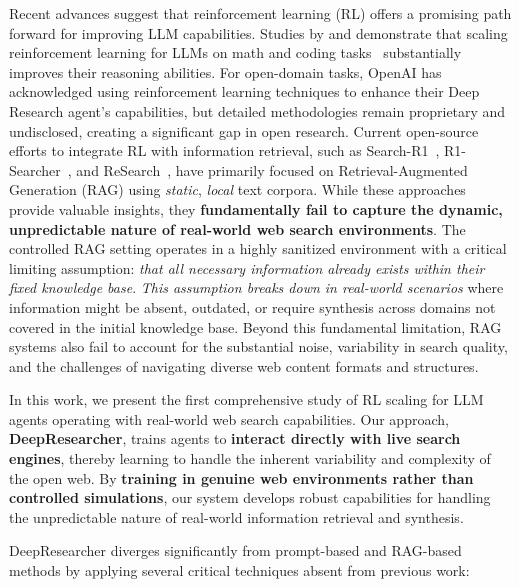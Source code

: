 \documentclass{article}
\newcommand{\scrl}{DeepResearcher\xspace}
\begin{document}
Recent advances suggest that reinforcement learning (RL) offers a promising path forward for improving LLM capabilities. Studies by \citet{guo2025deepseek} and \citet{team2025kimi} demonstrate that scaling reinforcement learning for LLMs on math and coding tasks~\cite{li2025limr} substantially improves their reasoning abilities. For open-domain tasks, OpenAI has acknowledged using reinforcement learning techniques to enhance their Deep Research agent's capabilities, but detailed methodologies remain proprietary and undisclosed, creating a significant gap in open research. Current open-source efforts to integrate RL with information retrieval, such as Search-R1~\cite{jin2025search}, R1-Searcher~\cite{song2025r1}, and ReSearch~\cite{chen2025research}, have primarily focused on Retrieval-Augmented Generation (RAG) using \emph{static}, \emph{local} text corpora. While these approaches provide valuable insights, they \textbf{fundamentally fail to capture the dynamic, unpredictable nature of real-world web search environments}. The controlled RAG setting operates in a highly sanitized environment with a critical limiting assumption: \emph{that all necessary information already exists within their fixed knowledge base}. \emph{This assumption breaks down in real-world scenarios} where information might be absent, outdated, or require synthesis across domains not covered in the initial knowledge base. Beyond this fundamental limitation, RAG systems also fail to account for the substantial noise, variability in search quality, and the challenges of navigating diverse web content formats and structures.


In this work, we present the first comprehensive study of RL scaling for LLM agents operating with real-world web search capabilities. Our approach, \textbf{\scrl}, trains agents to \textbf{interact directly with live search engines}, thereby learning to handle the inherent variability and complexity of the open web. By \textbf{training in genuine web environments rather than controlled simulations}, our system develops robust capabilities for handling the unpredictable nature of real-world information retrieval and synthesis.


\scrl diverges significantly from prompt-based and RAG-based methods by applying several critical techniques absent from previous work:
\end{document}
